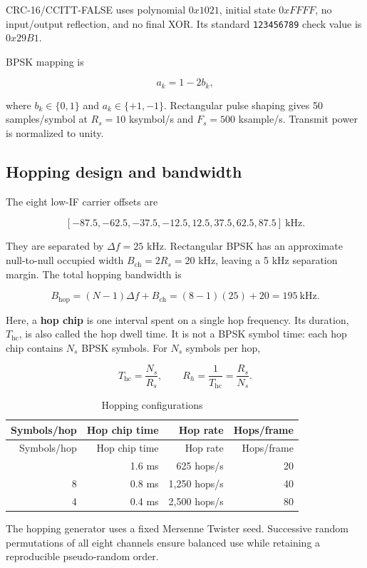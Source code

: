 \documentclass[
]{article}
\begin{document}
CRC-16/CCITT-FALSE uses polynomial \(0x1021\), initial state \(0xFFFF\),
no input/output reflection, and no final XOR. Its standard
\texttt{123456789} check value is \(0x29B1\).

BPSK mapping is

\[a_k = 1-2b_k,\]

where \(b_k\in\{0,1\}\) and \(a_k\in\{+1,-1\}\). Rectangular pulse
shaping gives 50 samples/symbol at \(R_s=10\) ksymbol/s and \(F_s=500\)
ksample/s. Transmit power is normalized to unity.

\subsection{Hopping design and
bandwidth}\label{hopping-design-and-bandwidth}

The eight low-IF carrier offsets are

\[[-87.5,-62.5,-37.5,-12.5,12.5,37.5,62.5,87.5]\ \text{kHz}.\]

They are separated by \(\Delta f=25\) kHz. Rectangular BPSK has an
approximate null-to-null occupied width \(B_\text{ch}=2R_s=20\) kHz,
leaving a 5 kHz separation margin. The total hopping bandwidth is

\[B_\text{hop}=(N-1)\Delta f+B_\text{ch}
            =(8-1)(25)+20=195\ \text{kHz}.\]

Here, a \textbf{hop chip} is one interval spent on a single hop
frequency. Its duration, \(T_\mathrm{hc}\), is also called the hop dwell
time. It is not a BPSK symbol time: each hop chip contains \(N_s\) BPSK
symbols. For \(N_s\) symbols per hop,

\[T_\mathrm{hc}=\frac{N_s}{R_s}, \qquad R_h=\frac{1}{T_\mathrm{hc}}=\frac{R_s}{N_s}.\]

\begin{longtable}[]{@{}rrrr@{}}
\caption{Hopping configurations}\label{tbl:hops}\tabularnewline
\toprule\noalign{}
Symbols/hop & Hop chip time & Hop rate & Hops/frame \\
\midrule\noalign{}
\endfirsthead
\toprule\noalign{}
Symbols/hop & Hop chip time & Hop rate & Hops/frame \\
\midrule\noalign{}
\endhead
\bottomrule\noalign{}
\endlastfoot
16 & 1.6 ms & 625 hops/s & 20 \\
8 & 0.8 ms & 1,250 hops/s & 40 \\
4 & 0.4 ms & 2,500 hops/s & 80 \\
\end{longtable}

The hopping generator uses a fixed Mersenne Twister seed. Successive
random permutations of all eight channels ensure balanced use while
retaining a reproducible pseudo-random order.
\end{document}
